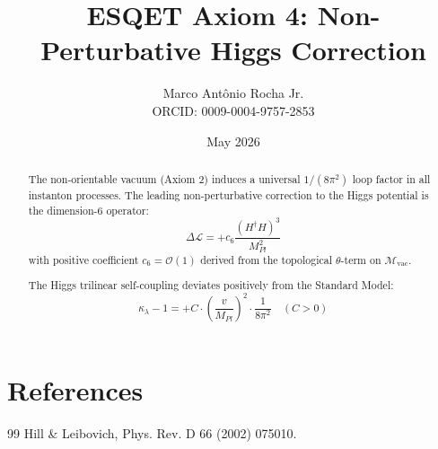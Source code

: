 \documentclass[11pt]{article}
\title{ESQET Axiom 4: Non-Perturbative Higgs Correction}
\author{Marco Antônio Rocha Jr. \\ 
        ORCID: 0009-0004-9757-2853}
\date{May 2026}
\begin{document}
\maketitle

\begin{abstract}
The non-orientable vacuum (Axiom 2) induces a universal $1/(8\pi^2)$ loop factor in all instanton processes. 
The leading non-perturbative correction to the Higgs potential is the dimension-6 operator:
\begin{equation}
\Delta\mathcal{L} = + c_6 \frac{(H^\dagger H)^3}{M_{Pl}^2}
\end{equation}
with positive coefficient $c_6 = \mathcal{O}(1)$ derived from the topological $\theta$-term on $\mathcal{M}_{\text{vac}}$.

The Higgs trilinear self-coupling deviates positively from the Standard Model:
\begin{equation}
\boxed{\kappa_{\lambda} - 1 = + C \cdot \left(\frac{v}{M_{Pl}}\right)^2 \cdot \frac{1}{8\pi^2} \quad (C > 0)}
\end{equation}
\end{abstract}

\section{References}
\begin{thebibliography}{99}
 Hill \& Leibovich, Phys. Rev. D 66 (2002) 075010.
\end{thebibliography}
\end{document}
